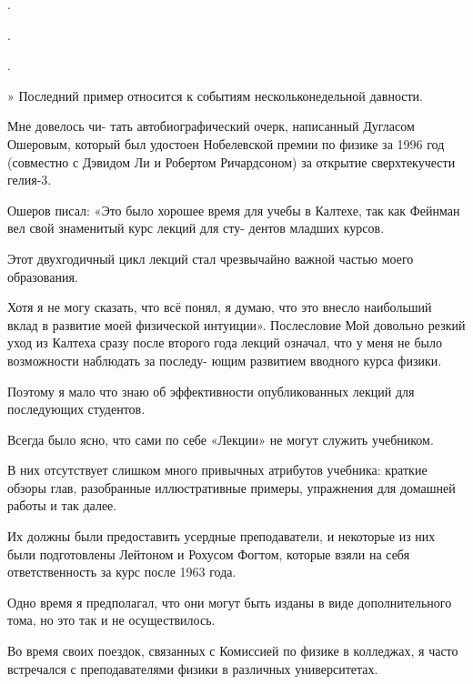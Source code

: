 \documentclass[10pt,oneside]{article}
\begin{document}
.\par

.\par

.\par

» Последний пример относится к событиям нескольконедельной давности.\par

Мне довелось чи- тать автобиографический очерк, написанный Дугласом Ошеровым, который был удостоен Нобелевской премии по физике за 1996 год (совместно с Дэвидом Ли и Робертом Ричардсоном) за открытие сверхтекучести гелия-3.\par

Ошеров писал: «Это было хорошее время для учебы в Калтехе, так как Фейнман вел свой знаменитый курс лекций для сту- дентов младших курсов.\par

Этот двухгодичный цикл лекций стал чрезвычайно важной частью моего образования.\par

Хотя я не могу сказать, что всё понял, я думаю, что это внесло наибольший вклад в развитие моей физической интуиции». Послесловие Мой довольно резкий уход из Калтеха сразу после второго года лекций означал, что у меня не было возможности наблюдать за последу- ющим развитием вводного курса физики.\par

Поэтому я мало что знаю об эффективности опубликованных лекций для последующих студентов.\par

Всегда было ясно, что сами по себе «Лекции» не могут служить учебником.\par

В них отсутствует слишком много привычных атрибутов учебника: краткие обзоры глав, разобранные иллюстративные примеры, упражнения для домашней работы и так далее.\par

Их должны были предоставить усердные преподаватели, и некоторые из них были подготовлены Лейтоном и Рохусом Фогтом, которые взяли на себя ответственность за курс после 1963 года.\par

Одно время я предполагал, что они могут быть изданы в виде дополнительного тома, но это так и не осуществилось.\par

Во время своих поездок, связанных с Комиссией по физике в колледжах, я часто встречался с преподавателями физики в различных университетах.\par
\end{document}

